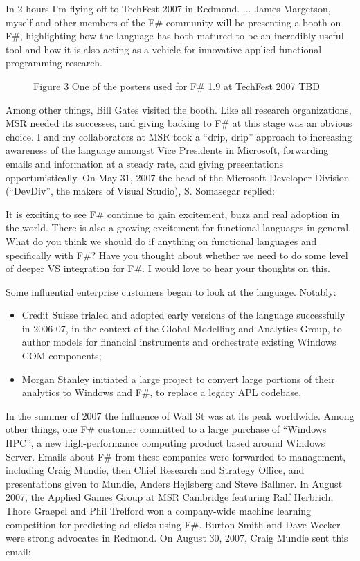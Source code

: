 \documentclass[acmsmall,review]{acmart}\settopmatter{printfolios=true,printccs=false,printacmref=false}
\begin{document}
\begin{verbquote}
In 2 hours I'm flying off to TechFest 2007 in Redmond. ... James Margetson, myself and other members of the F\# community will be presenting a booth on F\#, highlighting how the language has both matured to be an incredibly useful tool and how it is also acting as a vehicle for innovative applied functional programming research.
\end{verbquote}

\begin{figure}
Figure 3 One of the posters used for F\# 1.9 at TechFest 2007
TBD
\end{figure}

Among other things, Bill Gates visited the booth. Like all research organizations, MSR needed its successes, and giving backing to F\# at this stage was an obvious choice. I and my collaborators at MSR took a “drip, drip” approach to increasing awareness of the language amongst Vice Presidents in Microsoft, forwarding emails and information at a steady rate, and giving presentations opportunistically.   On May 31, 2007 the head of the Microsoft Developer Division (“DevDiv”, the makers of Visual Studio), S. Somasegar replied:

\begin{verbquote}
It is exciting to see F\# continue to gain excitement, buzz and real adoption in the world. There is also a growing excitement for functional languages in general. What do you think we should do if anything on functional languages and specifically with F\#?  Have you thought about whether we need to do some level of deeper VS integration for F\#.  I would love to hear your thoughts on this.
\end{verbquote}
Some influential enterprise customers began to look at the language.  Notably:

\begin{itemize}
\item Credit Suisse trialed and adopted early versions of the language successfully in 2006-07, in the context of the Global Modelling and Analytics Group, to author models for financial instruments and orchestrate existing Windows COM components;
\item Morgan Stanley initiated a large project to convert large portions of their analytics to Windows and F\#, to replace a legacy APL codebase. 
\end{itemize}

In the summer of 2007 the influence of Wall St was at its peak worldwide. Among other things, one F\# customer committed to a large purchase of “Windows HPC”, a new high-performance computing product based around Windows Server. Emails about F\# from these companies were forwarded to management, including Craig Mundie, then Chief Research and Strategy Office, and presentations given to Mundie, Anders Hejlsberg and Steve Ballmer.   In August 2007, the Applied Games Group at MSR Cambridge featuring Ralf Herbrich, Thore Graepel and Phil Trelford won a company-wide machine learning competition for predicting ad clicks using F\#.  Burton Smith and Dave Wecker were strong advocates in Redmond. On August 30, 2007, Craig Mundie sent this email:
\end{document}
